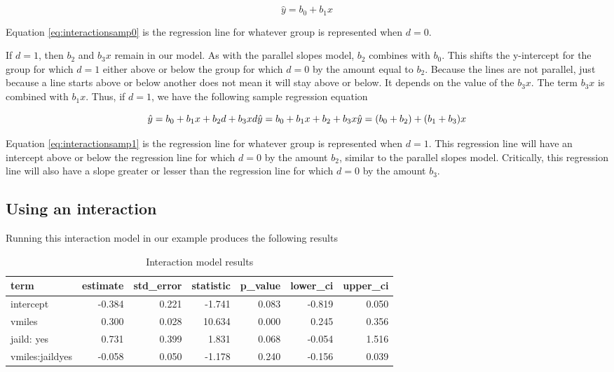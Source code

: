 \documentclass[
]{book}
\begin{document}
\begin{equation}
\hat{y} = b_0 + b_1x
\label{eq:interactionsamp0}
\end{equation}

Equation \eqref{eq:interactionsamp0} is the regression line for whatever group is represented when \(d=0\).

If \(d=1\), then \(b_2\) and \(b_3x\) remain in our model. As with the parallel slopes model, \(b_2\) combines with \(b_0\). This shifts the y-intercept for the group for which \(d=1\) either above or below the group for which \(d=0\) by the amount equal to \(b_2\). Because the lines are not parallel, just because a line starts above or below another does not mean it will stay above or below. It depends on the value of the \(b_3x\). The term \(b_3x\) is combined with \(b_1x\). Thus, if \(d=1\), we have the following sample regression equation

\begin{equation}
\hat{y} = b_0 + b_1x + b_2d + b_3xd\\
\hat{y} = b_0 + b_1x + b_2 + b_3x\\
\hat{y} = (b_0 + b_2) + (b_1 + b_3)x
\label{eq:interactionsamp1}
\end{equation}

Equation \eqref{eq:interactionsamp1} is the regression line for whatever group is represented when \(d=1\). This regression line will have an intercept above or below the regression line for which \(d=0\) by the amount \(b_2\), similar to the parallel slopes model. Critically, this regression line will also have a slope greater or lesser than the regression line for which \(d=0\) by the amount \(b_3\).

\hypertarget{using-an-interaction}{%
\subsection{Using an interaction}\label{using-an-interaction}}

Running this interaction model in our example produces the following results

\begin{table}

\caption{\label{tab:interactionmod}Interaction model results}
\centering
\begin{tabular}[t]{l|r|r|r|r|r|r}
\hline
term & estimate & std\_error & statistic & p\_value & lower\_ci & upper\_ci\\
\hline
intercept & -0.384 & 0.221 & -1.741 & 0.083 & -0.819 & 0.050\\
\hline
vmiles & 0.300 & 0.028 & 10.634 & 0.000 & 0.245 & 0.356\\
\hline
jaild: yes & 0.731 & 0.399 & 1.831 & 0.068 & -0.054 & 1.516\\
\hline
vmiles:jaildyes & -0.058 & 0.050 & -1.178 & 0.240 & -0.156 & 0.039\\
\hline
\end{tabular}
\end{table}
\end{document}
